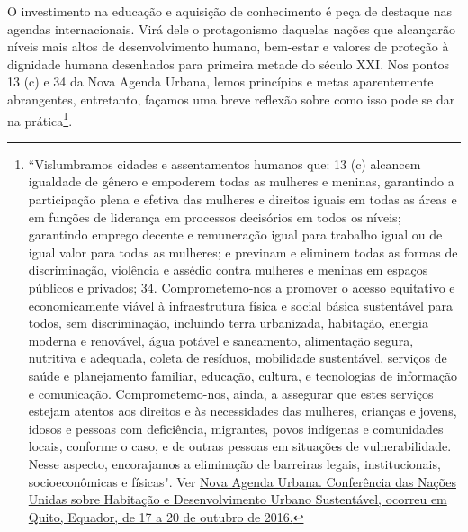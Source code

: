 \documentclass[14pt]{extarticle}
\begin{document}
O investimento na educação e aquisição de conhecimento é peça de destaque nas agendas internacionais. Virá dele o protagonismo daquelas nações que alcançarão níveis mais altos de desenvolvimento humano, bem-estar e valores de proteção à dignidade humana desenhados para primeira metade do século XXI. Nos pontos 13 (c) e 34 da Nova Agenda Urbana, lemos princípios e metas aparentemente abrangentes, entretanto, façamos uma breve reflexão sobre como isso pode se dar na prática\footnote{``Vislumbramos cidades e assentamentos humanos que: 13 (c) alcancem igualdade de gênero e empoderem todas as mulheres e meninas, garantindo a participação plena e efetiva das mulheres e direitos iguais em todas as áreas e em funções de liderança em processos decisórios em todos os níveis; garantindo emprego decente e remuneração igual para trabalho igual ou de igual valor para todas as mulheres; e previnam e eliminem todas as formas de discriminação, violência e assédio contra mulheres e meninas em espaços públicos e privados; 34. Comprometemo-nos a promover o acesso equitativo e economicamente viável à infraestrutura física e social básica sustentável para todos, sem discriminação, incluindo terra urbanizada, habitação, energia moderna e renovável, água potável e saneamento, alimentação segura, nutritiva e adequada, coleta de resíduos, mobilidade sustentável, serviços de saúde e planejamento familiar, educação, cultura, e tecnologias de informação e comunicação. Comprometemo-nos, ainda, a assegurar que estes serviços estejam atentos aos direitos e às necessidades das mulheres, crianças e jovens, idosos e pessoas com deficiência, migrantes, povos indígenas e comunidades locais, conforme o caso, e de outras pessoas em situações de vulnerabilidade. Nesse aspecto, encorajamos a eliminação de barreiras legais, institucionais, socioeconômicas e físicas". Ver \href{https://habitat3.org/wp-content/uploads/NUA-Portuguese-Brazil.pdf}{Nova Agenda Urbana. Conferência das Nações Unidas sobre Habitação e Desenvolvimento Urbano Sustentável, ocorreu em Quito, Equador, de 17 a 20 de outubro de 2016.}}.\\ 
\end{document}
